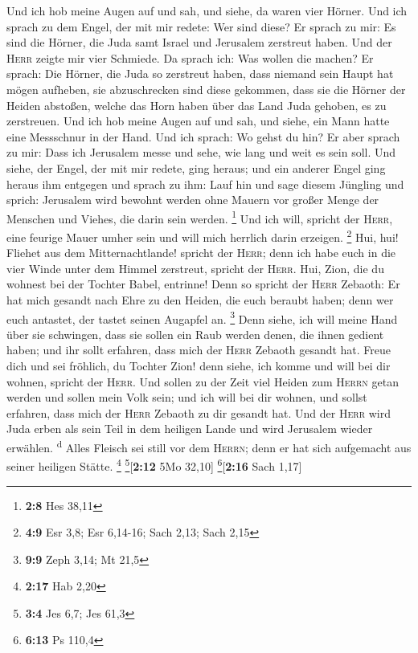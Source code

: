  Und ich hob meine Augen auf und sah, und siehe, da waren
vier Hörner.  Und ich sprach zu dem Engel, der mit mir
redete: Wer sind diese? Er sprach zu mir: Es sind die Hörner, die Juda
samt Israel und Jerusalem zerstreut haben.  Und der
\textsc{Herr} zeigte mir vier Schmiede.  Da sprach ich:
Was wollen die machen? Er sprach: Die Hörner, die Juda so zerstreut
haben, dass niemand sein Haupt hat mögen aufheben, sie abzuschrecken
sind diese gekommen, dass sie die Hörner der Heiden abstoßen, welche das
Horn haben über das Land Juda gehoben, es zu zerstreuen. 
Und ich hob meine Augen auf und sah, und siehe, ein Mann hatte eine
Messschnur in der Hand.  Und ich sprach: Wo gehst du hin?
Er aber sprach zu mir: Dass ich Jerusalem messe und sehe, wie lang und
weit es sein soll.  Und siehe, der Engel, der mit mir
redete, ging heraus; und ein anderer Engel ging heraus ihm entgegen
 und sprach zu ihm: Lauf hin und sage diesem Jüngling und
sprich: Jerusalem wird bewohnt werden ohne Mauern vor großer Menge der
Menschen und Viehes, die darin sein werden. \footnote{\textbf{2:8} Hes
  38,11}  Und ich will, spricht der \textsc{Herr}, eine
feurige Mauer umher sein und will mich herrlich darin erzeigen.
\footnote{\textbf{4:9} Esr 3,8; Esr 6,14-16; Sach 2,13; Sach 2,15}
 Hui, hui! Fliehet aus dem Mitternachtlande! spricht der
\textsc{Herr}; denn ich habe euch in die vier Winde unter dem Himmel
zerstreut, spricht der \textsc{Herr}.  Hui, Zion, die du
wohnest bei der Tochter Babel, entrinne!  Denn so spricht
der \textsc{Herr} Zebaoth: Er hat mich gesandt nach Ehre zu den Heiden,
die euch beraubt haben; denn wer euch antastet, der tastet seinen
Augapfel an. \footnote{\textbf{9:9} Zeph 3,14; Mt 21,5} 
Denn siehe, ich will meine Hand über sie schwingen, dass sie sollen ein
Raub werden denen, die ihnen gedient haben; und ihr sollt erfahren, dass
mich der \textsc{Herr} Zebaoth gesandt hat.  Freue dich
und sei fröhlich, du Tochter Zion! denn siehe, ich komme und will bei
dir wohnen, spricht der \textsc{Herr}.  Und sollen zu der
Zeit viel Heiden zum \textsc{Herrn} getan werden und sollen mein Volk
sein; und ich will bei dir wohnen, und sollst erfahren, dass mich der
\textsc{Herr} Zebaoth zu dir gesandt hat.  Und der
\textsc{Herr} wird Juda erben als sein Teil in dem heiligen Lande und
wird Jerusalem wieder erwählen. \textsuperscript{d} 
Alles Fleisch sei still vor dem \textsc{Herrn}; denn er hat sich
aufgemacht aus seiner heiligen Stätte. \footnote{\textbf{2:17} Hab 2,20}
\footnote{\textbf{3:4} Jes 6,7; Jes 61,3}{[}\textbf{2:12} 5Mo 32,10{]}
\footnote{\textbf{6:13} Ps 110,4}{[}\textbf{2:16} Sach 1,17{]}

